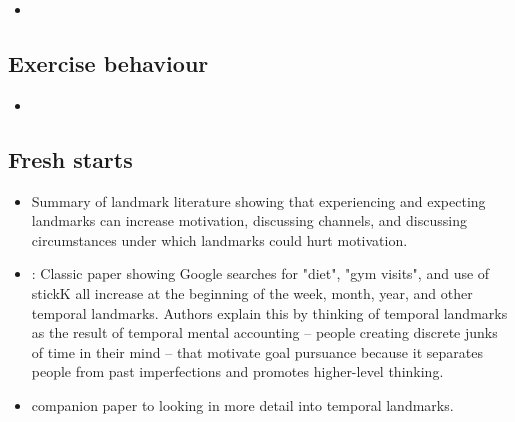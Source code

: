 \documentclass[a4paper, 11pt]{report}
\begin{document}
\begin{itemize}
	\item \citet{chapman2019decision}
\end{itemize}


\subsection{Exercise behaviour}

\begin{itemize}
	\item \citet{charness2009incentives}
\end{itemize}



\subsection{Fresh starts}

\begin{itemize}
	\item \citet{dai2019experiencing} Summary of landmark literature showing that experiencing and expecting landmarks can increase motivation, discussing channels, and discussing circumstances under which landmarks could hurt motivation.

	\item \citet{dai2014fresh}: Classic paper showing Google searches for "diet", "gym visits", and use of stickK all increase at the beginning of the week, month, year, and other temporal landmarks. Authors explain this by thinking of temporal landmarks as the result of temporal mental accounting -- people creating discrete junks of time in their mind -- that motivate goal pursuance because it separates people from past imperfections and promotes higher-level thinking.

	\item \citet{dai2015put} companion paper to \citet{dai2014fresh} looking in more detail into temporal landmarks.
\end{itemize}
\end{document}
